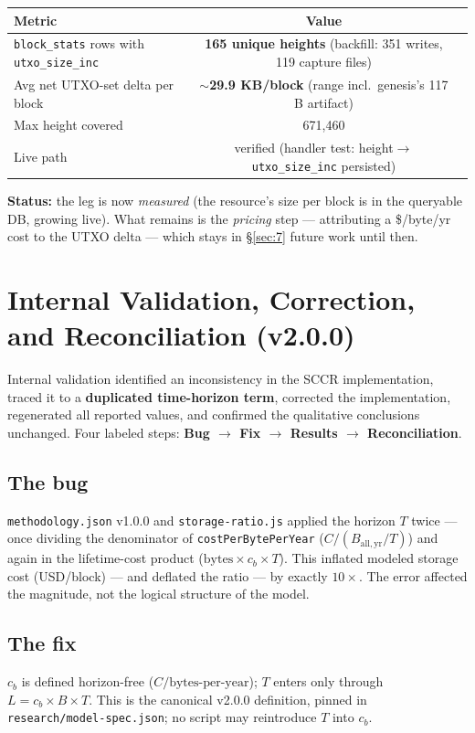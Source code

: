 \documentclass[11pt]{article}
\begin{document}
\begin{center}
\begin{tabular}{lcl}
\toprule
Metric & Value & \\
\midrule
\texttt{block\_stats} rows with \texttt{utxo\_size\_inc} & \textbf{165 unique heights} (backfill: 351 writes, 119 capture files) & \\
Avg net UTXO-set delta per block & $\sim$\textbf{29.9 KB/block} (range incl.\ genesis's 117 B artifact) & \\
Max height covered & 671,460 & \\
Live path & verified (handler test: height$\to$\texttt{utxo\_size\_inc} persisted) & \\
\bottomrule
\end{tabular}
\end{center}

\textbf{Status:} the leg is now \emph{measured} (the resource's size per block is in the queryable DB, growing live). What remains is the \emph{pricing} step --- attributing a \$/byte/yr cost to the UTXO delta --- which stays in \S\ref{sec:7} future work until then.

\section{Internal Validation, Correction, and Reconciliation (v2.0.0)}\label{sec:6}
Internal validation identified an inconsistency in the SCCR implementation, traced it to a \textbf{duplicated time-horizon term}, corrected the implementation, regenerated all reported values, and confirmed the qualitative conclusions unchanged. Four labeled steps: \textbf{Bug $\rightarrow$ Fix $\rightarrow$ Results $\rightarrow$ Reconciliation}.

\subsection{The bug}\label{sec:6.1}
\texttt{methodology.json} v1.0.0 and \texttt{storage-ratio.js} applied the horizon $T$ twice --- once dividing the denominator of \texttt{costPerBytePerYear} ($C / (B_{\mathrm{all,yr}} / T)$) and again in the lifetime-cost product ($\mathrm{bytes} \times c_b \times T$). This inflated modeled storage cost (USD/block) --- and deflated the ratio --- by exactly \textbf{$10\times$}. The error affected the magnitude, not the logical structure of the model.

\subsection{The fix}\label{sec:6.2}
$c_b$ is defined horizon-free ($C / \text{bytes-per-year}$); $T$ enters only through $L = c_b \times B \times T$. This is the canonical v2.0.0 definition, pinned in \texttt{research/model-spec.json}; no script may reintroduce $T$ into $c_b$.
\end{document}
